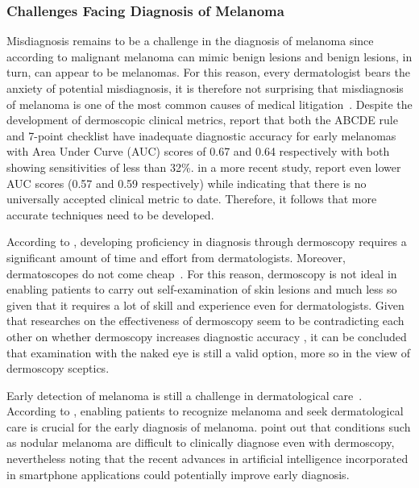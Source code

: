 \documentclass[12pt, a4paper]{article}
\begin{document}
\subsubsection{Challenges Facing Diagnosis of Melanoma}
Misdiagnosis remains to be a challenge in the diagnosis of melanoma since according to \cite{GRANTKELS1999539} malignant melanoma can mimic benign lesions and benign lesions, in turn, can appear to be melanomas. For this reason, every dermatologist bears the anxiety of potential misdiagnosis, it is therefore not surprising that misdiagnosis of melanoma is one of the most common causes of medical litigation~\citep{marghoob2009most}. Despite the development of dermoscopic clinical metrics, \cite{skvara2005limitations} report that both the ABCDE rule and 7-point checklist have inadequate diagnostic accuracy for early melanomas with Area Under Curve (AUC) scores of 0.67 and 0.64 respectively with both showing sensitivities of less than 32\%. \cite{zenone2022digital} in a more recent study, report even lower AUC scores (0.57 and 0.59 respectively) while indicating that there is no universally accepted clinical metric to date. Therefore, it follows that more accurate techniques need to be developed.

According to \cite{lee2010dermatoscopy}, developing proficiency in diagnosis through dermoscopy requires a significant amount of time and effort from dermatologists. Moreover, dermatoscopes do not come cheap~\citep{engasser2010dermatoscopy}. For this reason, dermoscopy is not ideal in enabling patients to carry out self-examination of skin lesions and much less so given that it requires a lot of skill and experience even for dermatologists. Given that researches on the effectiveness of dermoscopy seem to be contradicting each other on whether dermoscopy increases diagnostic accuracy \citep{skvara2005limitations, lee2010dermatoscopy}, it can be concluded that examination with the naked eye is still a valid option, more so in the view of dermoscopy sceptics.

\clearpage
Early detection of melanoma is still a challenge in dermatological care~\citep{di2010automatic, corneli2018improving}. According to \cite{divito2010advances}, enabling patients to recognize melanoma and seek dermatological care is crucial for the early diagnosis of melanoma. \cite{corneli2018improving} point out that conditions such as nodular melanoma are difficult to clinically diagnose even with dermoscopy, nevertheless noting that the recent advances in artificial intelligence incorporated in smartphone applications could potentially improve early diagnosis.
\end{document}
